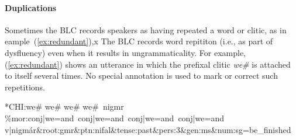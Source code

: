 \paragraph{Duplications}
Sometimes the BLC records speakers as having repeated a word or clitic, as in eample~(\ref{ex:redundant}),x
The BLC records word repititon (i.e., as part of dysfluency) even when it results in ungrammaticality.
For example, (\ref{ex:redundant}) shows an utterance in which the prefixal clitic \textit{we\#} is 
attached to itself several times. No special annotation is used to mark or correct such repetitions. 
\begin{exe} 
\ex \label{ex:redundant} \textsf{*CHI:\quad we\# we\# we\# we\#\, nigmr } \\
   \textsf{\%mor:\quad conj|we=and\, conj|we=and\, conj|we=and\, conj|we=and} \\
   \textsf{v|nigm\'ar\&root:gmr\&ptn:nifal\&tense:past\&pers:3\&gen:ms\&num:sg=be\_finished }
\end{exe}

 
